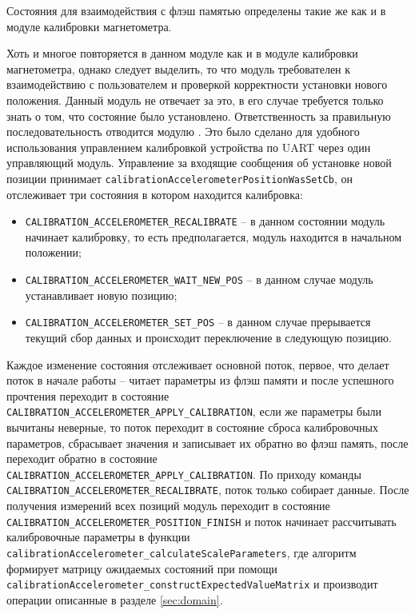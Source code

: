 Состояния для взаимодействия с флэш памятью определены такие же как и в модуле калибровки магнетометра. 

Хоть и многое повторяется в данном модуле как и в модуле калибровки магнетометра, однако следует выделить,
то что модуль требователен к взаимодействию с пользователем и проверкой корректности
установки нового положения. Данный модуль не отвечает за это, в его случае требуется только знать о том, что состояние было установлено. Ответственность
за правильную последовательность отводится модулю \moduleCalibControl . Это было сделано для удобного использования управлением калибровкой устройства по
UART через один управляющий модуль. Управление за входящие сообщения об установке новой позиции принимает \lstinline{calibrationAccelerometerPositionWasSetCb},
он отслеживает три состояния в котором находится калибровка:

\begin{itemize}
    \item \lstinline{CALIBRATION_ACCELEROMETER_RECALIBRATE} -- в данном состоянии модуль начинает калибровку, то есть предполагается, модуль находится в начальном положении;
    \item \lstinline{CALIBRATION_ACCELEROMETER_WAIT_NEW_POS} -- в данном случае модуль устанавливает новую позицию;
    \item \lstinline{CALIBRATION_ACCELEROMETER_SET_POS} -- в данном случае прерывается текущий сбор данных и происходит переключение в следующую позицию.
\end{itemize}


Каждое изменение состояния отслеживает основной поток, первое, что делает поток в начале работы -- читает параметры из флэш памяти и после успешного прочтения переходит в состояние
\lstinline{CALIBRATION_ACCELEROMETER_APPLY_CALIBRATION}, если же параметры были вычитаны неверные, то поток переходит в состояние
сброса калибровочных параметров, сбрасывает значения и записывает их обратно во флэш память, после переходит обратно в состояние
\lstinline{CALIBRATION_ACCELEROMETER_APPLY_CALIBRATION}. По приходу команды \lstinline{CALIBRATION_ACCELEROMETER_RECALIBRATE}, поток только
собирает данные.
После получения измерений всех позиций модуль переходит в состояние \lstinline{CALIBRATION_ACCELEROMETER_POSITION_FINISH} и поток начинает рассчитывать калибровочные параметры в функции 
\lstinline{calibrationAccelerometer_calculateScaleParameters}, где алгоритм формирует матрицу ожидаемых состояний при помощи
\lstinline{calibrationAccelerometer_constructExpectedValueMatrix} и производит операции описанные в разделе \ref{sec:domain}.

